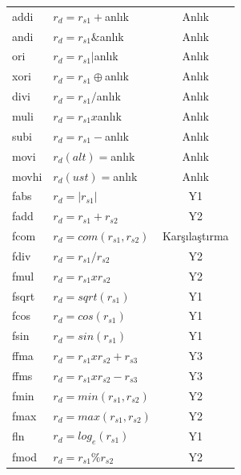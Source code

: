 \begin{longtable}{p{50pt} p{300pt} p{70pt}}
\hline \hline
\endlastfoot
  addi		&	 $r_{d} = r_{s1} + 			$anlık 	& \multicolumn{1}{c}{Anlık} 	\\
  andi 		&	 $r_{d} = r_{s1} \& 		$anlık 	& \multicolumn{1}{c}{Anlık}  	\\
  ori 		&	 $r_{d} = r_{s1} | 			$anlık  & \multicolumn{1}{c}{Anlık}  	\\
  xori 		&	 $r_{d} = r_{s1} \oplus $anlık 	& \multicolumn{1}{c}{Anlık}  	\\
  divi 		&	 $r_{d} = r_{s1} / 			$anlık  & \multicolumn{1}{c}{Anlık}  	\\
  muli 		&	 $r_{d} = r_{s1} x 			$anlık  & \multicolumn{1}{c}{Anlık}  	\\
  subi 		&	 $r_{d} = r_{s1} - 			$anlık  & \multicolumn{1}{c}{Anlık}  	\\
  movi 		&	 $r_{d}(alt) = 	$anlık  & \multicolumn{1}{c}{Anlık}  	\\
  movhi		&	 $r_{d}(ust) = 	$anlık  & \multicolumn{1}{c}{Anlık}  	\\
  fabs  	&  $r_{d} = |r_{s1}|			$				&	\multicolumn{1}{c}{Y1}		 	\\
  fadd  	&  $r_{d} = r_{s1} + r_{s2}$			&	\multicolumn{1}{c}{Y2}		 	\\
  fcom  	&  $r_{d} = com(r_{s1},r_{s2})$		&	\multicolumn{1}{c}{Karşılaştırma}	 	\\
  fdiv  	&  $r_{d} = r_{s1} / r_{s2}$			&	\multicolumn{1}{c}{Y2}		 	\\
  fmul  	&  $r_{d} = r_{s1} x r_{s2}$			&	\multicolumn{1}{c}{Y2}		 	\\
  fsqrt  	&  $r_{d} = sqrt(r_{s1})$					&	\multicolumn{1}{c}{Y1}		 	\\
  fcos  	&  $r_{d} = cos(r_{s1})$					&	\multicolumn{1}{c}{Y1}		 	\\
  fsin  	&  $r_{d} = sin(r_{s1})$					&	\multicolumn{1}{c}{Y1}		 	\\
  ffma  	&  $r_{d} = r_{s1}xr_{s2}+r_{s3}$	&	\multicolumn{1}{c}{Y3}		 	\\
  ffms  	&  $r_{d} = r_{s1}xr_{s2}-r_{s3}$	&	\multicolumn{1}{c}{Y3}		 	\\
  fmin  	&  $r_{d} = min(r_{s1},r_{s2})$		&	\multicolumn{1}{c}{Y2}		 	\\
  fmax  	&  $r_{d} = max(r_{s1},r_{s2})$		& \multicolumn{1}{c}{Y2}			\\
  fln 	 	&	 $r_{d} = log_{e}(r_{s1})$			& \multicolumn{1}{c}{Y1}			\\
  fmod 		&	 $r_{d} = r_{s1} \% r_{s2} $ 		& \multicolumn{1}{c}{Y2}  		\\

\end{longtable}
